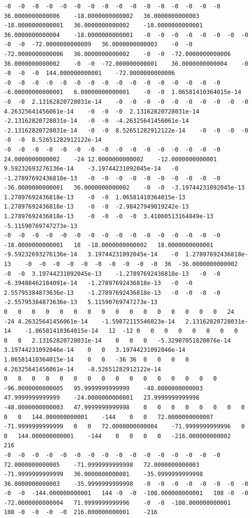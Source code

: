 \documentclass[12pt]{report} %
\begin{document}
\begin{landscape}
\begin{lstlisting}[numbers=none, basicstyle=\ttfamily\tiny, captionpos=b, caption={Matriz de coeficientes $W = G^{-1}$ ($54\times54$) calculada con MATLAB, sin redondear.}, label=cod:W-matlab]
-0	-0	-0	-0	-0	-0	-0	-0	-0	-0	-0	-0	-0	-0	-0	-0	36.0000000000006	-18.0000000000002	36.0000000000003	-18.0000000000001	36.0000000000002	-18.0000000000001	36.0000000000004	-18.0000000000001	-0	-0	-0	-0	-0	-0	-0	-0	-0	-0	-72.0000000000009	36.0000000000003	-0	-0	-72.0000000000006	36.0000000000002	-0	-0	-72.0000000000006	36.0000000000002	-0	-0	-72.000000000001	36.0000000000004	-0	-0	-0	-0	144.000000000001	-72.0000000000006
-0	-0	-0	-0	-0	-0	-0	-0	-0	-0	-0	-0	-0	-0	-0	-0	-6.00000000000001	6.00000000000001	-0	-0	1.06581410364015e-14	-0	-0	2.13162820728031e-14	-0	-0	-0	-0	-0	-0	-0	-0	-0	-0	4.26325641456061e-14	-0	-0	-0	2.13162820728031e-14	-2.13162820728031e-14	-0	-0	-4.26325641456061e-14	-2.13162820728031e-14	-0	-0	8.52651282912122e-14	-0	-0	-0	-0	-0	-0	8.52651282912122e-14
-0	-0	-0	-0	-0	-0	-0	-0	-0	-0	-0	-0	-0	-0	-0	-0	24.0000000000002	-24	12.0000000000002	-12.0000000000001	9.59232693276136e-14	-3.19744231092045e-14	-0	-1.27897692436818e-13	-0	-0	-0	-0	-0	-0	-0	-0	-0	-0	-36.0000000000001	36.0000000000002	-0	-0	-3.19744231092045e-13	1.27897692436818e-13	-0	-0	1.06581410364015e-13	1.27897692436818e-13	-0	-0	-2.98427949019242e-13	1.27897692436818e-13	-0	-0	-0	-0	3.41060513164849e-13	-5.11590769747273e-13
-0	-0	-0	-0	-0	-0	-0	-0	-0	-0	-0	-0	-0	-0	-0	-0	-18.0000000000001	18	-18.0000000000002	18.0000000000001	-9.59232693276136e-14	3.19744231092045e-14	-0	1.27897692436818e-13	-0	-0	-0	-0	-0	-0	-0	-0	-0	-0	36	-36.0000000000002	-0	-0	3.19744231092045e-13	-1.27897692436818e-13	-0	-0	-6.39488462184091e-14	-1.27897692436818e-13	-0	-0	2.55795384873636e-13	-1.27897692436818e-13	-0	-0	-0	-0	-2.55795384873636e-13	5.11590769747273e-13
0	0	0	0	0	0	0	0	0	0	0	0	0	0	0	0	24	-24	4.26325641456061e-14	-1.59872115546023e-14	2.13162820728031e-14	-1.06581410364015e-14	12	-12	0	0	0	0	0	0	0	0	0	0	2.13162820728031e-14	0	0	0	-5.32907051820076e-14	3.19744231092046e-14	0	0	3.19744231092046e-14	1.06581410364015e-14	0	0	-36	36	0	0	0	0	4.26325641456061e-14	-8.52651282912122e-14
0	0	0	0	0	0	0	0	0	0	0	0	0	0	0	0	-96.0000000000005	95.9999999999999	-48.0000000000003	47.9999999999999	-24.0000000000001	23.9999999999998	-48.0000000000003	47.9999999999998	0	0	0	0	0	0	0	0	0	0	144.000000000001	-144	0	0	72.0000000000007	-71.9999999999999	0	0	72.0000000000004	-71.9999999999996	0	0	144.000000000001	-144	0	0	0	0	-216.000000000002	216
-0	-0	-0	-0	-0	-0	-0	-0	-0	-0	-0	-0	-0	-0	-0	-0	72.0000000000005	-71.9999999999998	72.0000000000003	-71.9999999999999	36.0000000000001	-35.9999999999998	36.0000000000003	-35.9999999999998	-0	-0	-0	-0	-0	-0	-0	-0	-0	-0	-144.000000000001	144	-0	-0	-108.000000000001	108	-0	-0	-72.0000000000004	71.9999999999996	-0	-0	-108.000000000001	108	-0	-0	-0	-0	216.000000000001	-216

\end{lstlisting}
\end{landscape}
\end{document}
